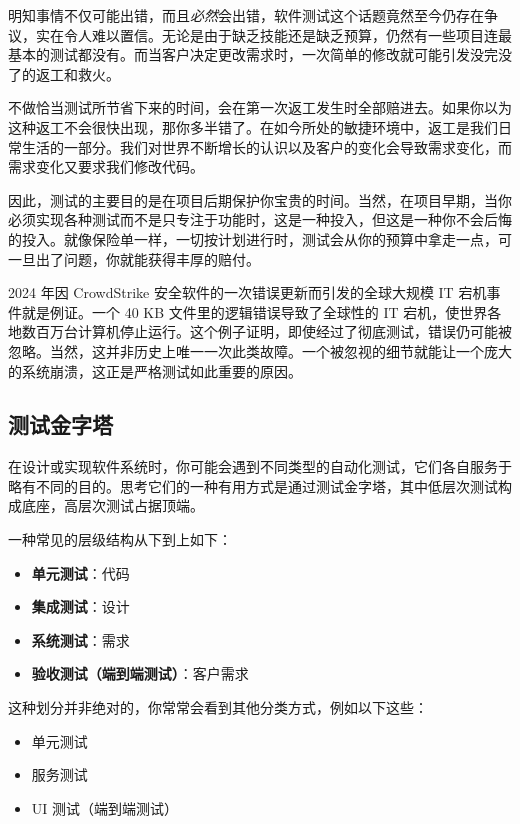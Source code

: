 明知事情不仅可能出错，而且\emph{必然}会出错，软件测试这个话题竟然至今仍存在争议，实在令人难以置信。无论是由于缺乏技能还是缺乏预算，仍然有一些项目连最基本的测试都没有。而当客户决定更改需求时，一次简单的修改就可能引发没完没了的返工和救火。

不做恰当测试所节省下来的时间，会在第一次返工发生时全部赔进去。如果你以为这种返工不会很快出现，那你多半错了。在如今所处的敏捷环境中，返工是我们日常生活的一部分。我们对世界不断增长的认识以及客户的变化会导致需求变化，而需求变化又要求我们修改代码。

因此，测试的主要目的是在项目后期保护你宝贵的时间。当然，在项目早期，当你必须实现各种测试而不是只专注于功能时，这是一种投入，但这是一种你不会后悔的投入。就像保险单一样，一切按计划进行时，测试会从你的预算中拿走一点，可一旦出了问题，你就能获得丰厚的赔付。

2024 年因 CrowdStrike 安全软件的一次错误更新而引发的全球大规模 IT 宕机事件就是例证。一个 40 KB 文件里的逻辑错误导致了全球性的 IT 宕机，使世界各地数百万台计算机停止运行。这个例子证明，即使经过了彻底测试，错误仍可能被忽略。当然，这并非历史上唯一一次此类故障。一个被忽视的细节就能让一个庞大的系统崩溃，这正是严格测试如此重要的原因。

\subsection{测试金字塔}

\label{idx:784}
\label{idx:785}
在设计或实现软件系统时，你可能会遇到不同类型的自动化测试，它们各自服务于略有不同的目的。思考它们的一种有用方式是通过测试金字塔，其中低层次测试构成底座，高层次测试占据顶端。

一种常见的层级结构从下到上如下：

\begin{itemize}
\item \textbf{单元测试}：代码
\item \textbf{集成测试}：设计
\item \textbf{系统测试}：需求
\item \textbf{验收测试（端到端测试）}：客户需求
\end{itemize}

这种划分并非绝对的，你常常会看到其他分类方式，例如以下这些：

\begin{itemize}
\item 单元测试
\item 服务测试
\item UI 测试（端到端测试）
\end{itemize}

